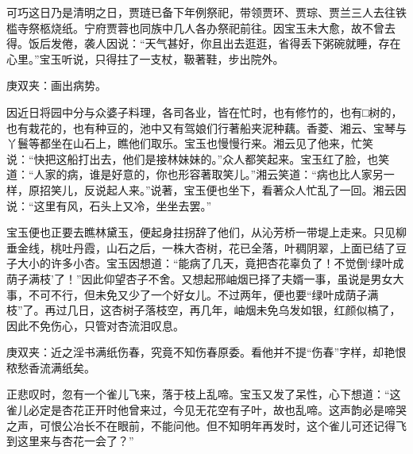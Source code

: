 \begin{parag}
    可巧这日乃是清明之日，贾琏已备下年例祭祀，带领贾环、贾琮、贾兰三人去往铁槛寺祭柩烧纸。宁府贾蓉也同族中几人各办祭祀前往。因宝玉未大愈，故不曾去得。饭后发倦，袭人因说：“天气甚好，你且出去逛逛，省得丢下粥碗就睡，存在心里。”宝玉听说，只得拄了一支杖，靸著鞋，步出院外。\begin{note}庚双夹：画出病势。\end{note}因近日将园中分与众婆子料理，各司各业，皆在忙时，也有修竹的，也有□树的，也有栽花的，也有种豆的，池中又有驾娘们行著船夹泥种藕。香菱、湘云、宝琴与丫鬟等都坐在山石上，瞧他们取乐。宝玉也慢慢行来。湘云见了他来，忙笑说：“快把这船打出去，他们是接林妹妹的。”众人都笑起来。宝玉红了脸，也笑道：“人家的病，谁是好意的，你也形容著取笑儿。”湘云笑道：“病也比人家另一样，原招笑儿，反说起人来。”说著，宝玉便也坐下，看著众人忙乱了一回。湘云因说：“这里有风，石头上又冷，坐坐去罢。”
\end{parag}


\begin{parag}
    宝玉便也正要去瞧林黛玉，便起身拄拐辞了他们，从沁芳桥一带堤上走来。只见柳垂金线，桃吐丹霞，山石之后，一株大杏树，花已全落，叶稠阴翠，上面已结了豆子大小的许多小杏。宝玉因想道：“能病了几天，竟把杏花辜负了！不觉倒‘绿叶成荫子满枝’了！”因此仰望杏子不舍。又想起邢岫烟已择了夫婿一事，虽说是男女大事，不可不行，但未免又少了一个好女儿。不过两年，便也要“绿叶成荫子满枝”了。再过几日，这杏树子落枝空，再几年，岫烟未免乌发如银，红颜似槁了，因此不免伤心，只管对杏流泪叹息。\begin{note}庚双夹：近之淫书满纸伤春，究竟不知伤春原委。看他并不提“伤春”字样，却艳恨秾愁香流满纸矣。\end{note}正悲叹时，忽有一个雀儿飞来，落于枝上乱啼。宝玉又发了呆性，心下想道：“这雀儿必定是杏花正开时他曾来过，今见无花空有子叶，故也乱啼。这声韵必是啼哭之声，可恨公冶长不在眼前，不能问他。但不知明年再发时，这个雀儿可还记得飞到这里来与杏花一会了？”
\end{parag}


